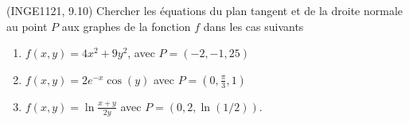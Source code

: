 
\begin{exercice}\label{exoFoncDeuxVar0027}

	(INGE1121, 9.10) Chercher les équations du plan tangent et de la droite normale au point $P$ aux graphes de la fonction $f$ dans les cas suivants
	\begin{enumerate}

		\item
			$f(x,y)=4x^2+9y^2$, avec $P=(-2,-1,25)$
		\item
			$f(x,y)=2 e^{-x}\cos(y)$ avec $P=(0,\frac{ \pi }{ 3 },1)$
		\item
			$f(x,y)=\ln\frac{ x+y }{ 2y }$ avec $P=(0,2,\ln(1/2))$.

	\end{enumerate}

\end{exercice}
